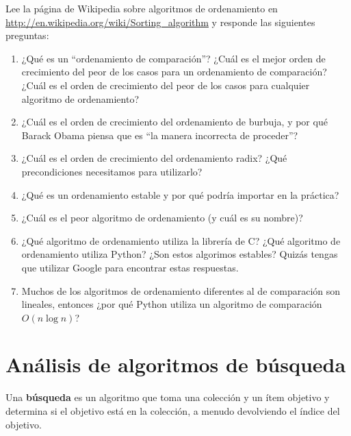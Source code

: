 \documentclass[10pt]{book}
\begin{document}
\begin{exercise}

Lee la página de Wikipedia sobre algoritmos de ordenamiento en
\url{http://en.wikipedia.org/wiki/Sorting_algorithm} y responde
las siguientes preguntas:

\begin{enumerate}

\item ¿Qué es un ``ordenamiento de comparación''? ¿Cuál es el mejor orden de crecimiento
  del peor de los casos para un ordenamiento de comparación?  ¿Cuál es el orden de crecimiento
  del peor de los casos para cualquier algoritmo de ordenamiento?

\item ¿Cuál es el orden de crecimiento del ordenamiento de burbuja, y por qué Barack
  Obama piensa que es ``la manera incorrecta de proceder''?

\item ¿Cuál es el orden de crecimiento del ordenamiento radix?  ¿Qué precondiciones
  necesitamos para utilizarlo?

\item ¿Qué es un ordenamiento estable y por qué podría importar en la práctica?

\item ¿Cuál es el peor algoritmo de ordenamiento (y cuál es su nombre)?

\item ¿Qué algoritmo de ordenamiento utiliza la librería de C?  ¿Qué algoritmo de ordenamiento
  utiliza Python?  ¿Son estos algorimos estables?  Quizás tengas que
  utilizar Google para encontrar estas respuestas.

\item Muchos de los algoritmos de ordenamiento diferentes al de comparación son lineales, entonces ¿por qué
  Python utiliza un algoritmo de comparación $O(n \log n)$?

\end{enumerate}

\end{exercise}


\section{Análisis de algoritmos de búsqueda}

Una {\bf búsqueda} es un algoritmo que toma una colección y un ítem objetivo
y determina si el objetivo está en la colección, a menudo
devolviendo el índice del objetivo.
\end{document}
